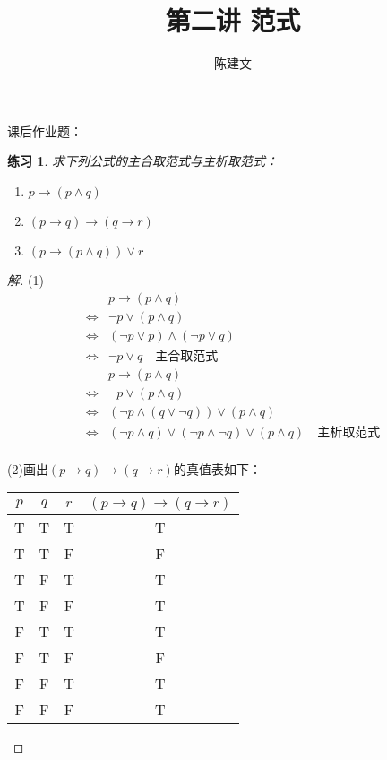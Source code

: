 \documentclass{article}
\newtheorem{Exercise}{练习}
\begin{document}
\begin{CJK*}{UTF8}{gbsn}
  \title{第二讲 范式}
  \author{陈建文}
  \maketitle


  课后作业题：

  \begin{Exercise}
    求下列公式的主合取范式与主析取范式：
    \begin{enumerate}
      \item $p\to (p\land q)$
      \item $(p\to q)\to (q\to r)$
      \item $(p\to (p\land q))\lor r$
    \end{enumerate}
  \end{Exercise}
  \begin{proof}[解]
    (1)
    \begin{align*}
      &p\to(p\land q)\\
      \Leftrightarrow & \lnot p \lor (p\land q)\\
      \Leftrightarrow & (\lnot p \lor p)\land (\lnot p \lor q)\\
      \Leftrightarrow & \lnot p \lor q\quad \text{主合取范式}\\
      &p\to(p\land q)\\
      \Leftrightarrow & \lnot p \lor (p\land q)\\
      \Leftrightarrow & (\lnot p \land (q \lor \lnot q))\lor (p\land q)\\
      \Leftrightarrow &(\lnot p \land q)\lor (\lnot p \land \lnot q)\lor (p\land q)\quad \text{主析取范式}\\
    \end{align*}


    (2)画出$(p\to q)\to (q\to r)$的真值表如下：

    \begin{tabular}{ccc|c}
      $p$& $q$& $r$& $(p\to q)\to (q\to r)$\\
      \hline
     T& T&T&T\\
      T&T&F&F\\
      T&F&T&T\\
       T& F&F&T\\
      F&T&T&T\\
      F&T&F&F\\
     F& F&T&T\\
      F&  F&F&T\\      
    \end{tabular}


\end{proof}
\end{CJK*}
\end{document}
